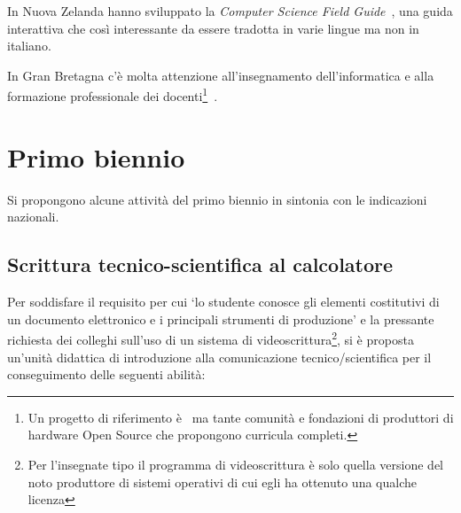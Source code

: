 \documentclass[a4paper]{easychair}
\begin{document}
In Nuova Zelanda hanno sviluppato la \textit{Computer Science Field Guide}~\cite{UniComputerScienceEducationResearchGroupCanterbury2023},
una guida interattiva che così interessante da essere tradotta in varie lingue ma non in italiano.

In Gran Bretagna c'è molta attenzione all'insegnamento dell'informatica
e alla formazione professionale dei docenti\footnote{Un progetto di riferimento è~\cite{nc4ce} ma tante comunità e fondazioni
di produttori di hardware Open Source che propongono curricula completi.
}~\cite{Fowler2021}.





\section{Primo biennio}
\label{sec:b1}

Si propongono alcune attività del primo biennio in sintonia con le indicazioni nazionali.

\subsection[Scrittura tecnico-scientifica]{Scrittura tecnico-scientifica al calcolatore} 

Per soddisfare il requisito per cui `lo studente conosce gli elementi costitutivi
di un documento elettronico e i principali strumenti di produzione' e la
pressante richiesta dei colleghi sull'uso di un sistema di videoscrittura\footnote{Per
l'insegnate tipo il programma di videoscrittura è solo quella versione del noto produttore
di sistemi operativi di cui egli ha ottenuto una qualche licenza}, si è proposta un'unità
didattica di introduzione alla comunicazione tecnico/scientifica per il conseguimento
delle seguenti abilità:
\end{document}
